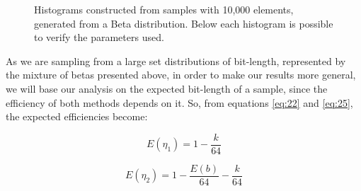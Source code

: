 \documentclass[10pt]{article}
\begin{document}
\begin{figure}[ht]
{  }
  \caption{Histograms constructed from samples with 10,000 elements, generated from a Beta distribution. Below each histogram is possible to verify the parameters used.}
  \label{fig:02}
\end{figure}

As we are sampling from a large set distributions of bit-length, represented by the mixture of betas presented above, in order to make our results more general, we will base our analysis on the expected bit-length of a sample, since the efficiency of both methods depends on it. So, from equations \ref{eq:22} and \ref{eq:25}, the expected efficiencies become: 
 
\begin{equation}\label{eq:56}
 E(\eta_1) = 1 - \frac{k}{64}
\end{equation}

\begin{equation}\label{eq:57}
 E(\eta_2) = 1 - \frac{E(b)}{64} - \frac{k}{64}
\end{equation}
\end{document}
